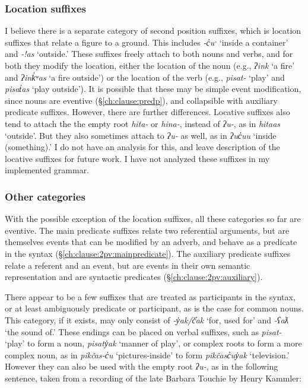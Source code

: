 \subsubsection{Location suffixes} \label{ch:clause:2pv:loc}

I believe there is a separate category of second position suffixes, which is location suffixes that relate a figure to a ground. This includes \textit{-c̓uˑ} `inside a container' and \textit{-!as} `outside.' These suffixes freely attach to both nouns and verbs, and for both they modify the location, either the location of the noun (e.g., \textit{ʔink} `a fire' and \textit{ʔink̓ʷas} `a fire outside') or the location of the verb (e.g., \textit{pisat-} `play' and \textit{pisat̓as} `play outside'). It is possible that these may be simple event modification, since nouns are eventive (\S\ref{ch:clause:predp}), and collapsible with auxiliary predicate suffixes. However, there are further differences. Locative suffixes also tend to attach the the empty root \textit{hita-} or \textit{hina-}, instead of \textit{ʔu-}, as in \textit{hitaas} `outside'. But they also sometimes attach to \textit{ʔu-} as well, as in \textit{ʔuc̓uu} `inside (something).' I do not have an analysis for this, and leave description of the locative suffixes for future work. I have not analyzed these suffixes in my implemented grammar.

\subsubsection{Other categories} \label{ch:clause:2pv:additional}

With the possible exception of the location suffixes, all these categories so far are eventive. The main predicate suffixes relate two referential arguments, but are themselves events that can be modified by an adverb, and behave as a predicate in the syntax (\S\ref{ch:clause:2pv:mainpredicate}). The auxiliary predicate suffixes relate a referent and an event, but are events in their own semantic representation and are syntactic predicates (\S\ref{ch:clause:2pv:auxiliary}).

There appear to be a few suffixes that are treated as participants in the syntax, or at least ambiguously predicate or participant, as is the case for common nouns. This category, if it exists, may only consist of \textit{-y̓ak/č̓ak} `for, used for' and \textit{-ʕaƛ} `the sound of.' These endings can be placed on verbal suffixes, such as \textit{pisat-} `play' to form a noun, \textit{pisaty̓ak} `manner of play', or complex roots to form a more complex noun, as in \textit{pikčas-c̓u} `pictures-inside' to form \textit{pikčasc̓uy̓ak} `television.' However they can also be used with the empty root \textit{ʔu-}, as in the following sentence, taken from a recording of the late Barbara Touchie by Henry Kammler:

